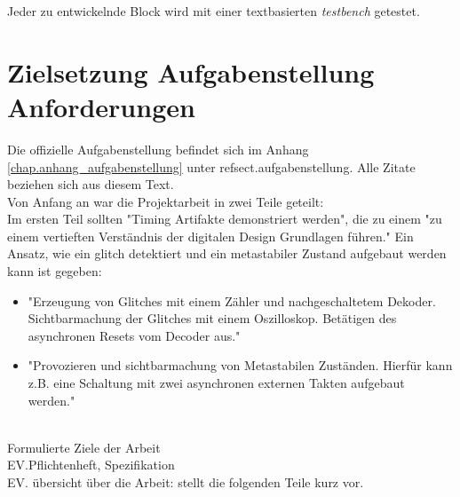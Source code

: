 Jeder zu entwickelnde Block wird mit einer textbasierten \textit{testbench} getestet. 

\section{Zielsetzung Aufgabenstellung Anforderungen}\label{sect.einleitung_ziele}
Die offizielle Aufgabenstellung befindet sich im Anhang \ref{chap.anhang_aufgabenstellung} unter ref{sect.aufgabenstellung}. Alle Zitate beziehen sich aus diesem Text.\\

Von Anfang an war die Projektarbeit in zwei Teile geteilt:\\Im ersten Teil sollten "Timing Artifakte demonstriert werden", die zu einem "zu einem vertieften Verständnis der digitalen Design Grundlagen führen." 
Ein Ansatz, wie ein glitch detektiert und ein metastabiler Zustand aufgebaut werden kann ist gegeben:\\
\begin{itemize}
	\item "Erzeugung von Glitches mit einem Zähler und nachgeschaltetem Dekoder. Sichtbarmachung der Glitches mit einem Oszilloskop. Betätigen des asynchronen Resets vom Decoder aus." 

	\item "Provozieren und sichtbarmachung von Metastabilen Zuständen. Hierfür kann z.B. eine Schaltung mit zwei asynchronen externen Takten aufgebaut werden." 
\end{itemize}  \\




Formulierte Ziele der Arbeit\\
EV.Pflichtenheft, Spezifikation\\
EV. übersicht über die Arbeit: stellt die folgenden Teile kurz vor.\\


